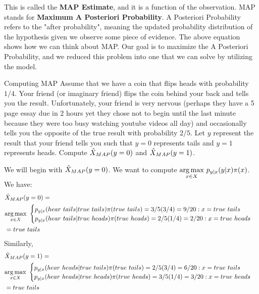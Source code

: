 This is called the \textbf{MAP Estimate}, and it is a function of the observation. MAP stands for \textbf{Maximum A Posteriori Probability}. A Posteriori Probability refers to the "after probability", meaning the 
updated probability distribution of the hypothesis given we observe some piece of evidence. The above equation shows how we can think about MAP. Our goal is to maximize the A Posteriori Probability, and we reduced this problem into one that we can solve by utilizing the model. \newline 

\begin{exmp}{Computing MAP}{}
Assume that we have a coin that flips heads with probability \(1/4\). Your friend (or imaginary friend) flips the coin behind your back and tells you the result. Unfortunately, your friend is very nervous (perhaps they have a 5 page essay due in 2 hours yet they chose not to begin until the last minute because they were too busy watching youtube videos all day) and occasionally tells you the opposite of the true result with probability \(2/5\). Let \(y\) represent the result that your friend tells you such that \(y=0\) represents tails and \(y=1\) represents heads. Compute \({\hat{X}_{MAP}} (y=0)\) and \({\hat{X}_{MAP}} (y=1)\). \newline 

We will begin with \({\hat{X}_{MAP}} (y=0)\). We want to compute \(\underset{x\in X}{\argmax}\ p_{y|x}(y|x)\pi(x)\). We have: 
\begin{align*}
  &\MAP (y=0) = \\
  &\underset{x\in X}{\argmax}\ 
\begin{cases}
	p_{y|x}(hear\ tails|true\ tails)\pi(true\ tails) = 3/5(3/4)=9/20:x=true \ tails \\
	p_{y|x}(hear\ tails|true\ heads)\pi(true\ heads) = 2/5(1/4) = 2/20:x=true\ heads
\end{cases} 
\\
&= true \ tails
\end{align*}
Similarly,
\begin{align*}
  &\MAP (y=1) = \\
  &\underset{x\in X}{\argmax}\ 
\begin{cases}
	p_{y|x}(hear\ heads|true\ tails)\pi(true\ tails) = 2/5(3/4)=6/20:x=true \ tails \\
	p_{y|x}(hear\ heads|true\ heads)\pi(true\ heads) = 3/5(1/4) = 3/20:x=true\ heads
\end{cases} 
\\
&= true \ tails
\end{align*}
\newline 


\end{exmp}
